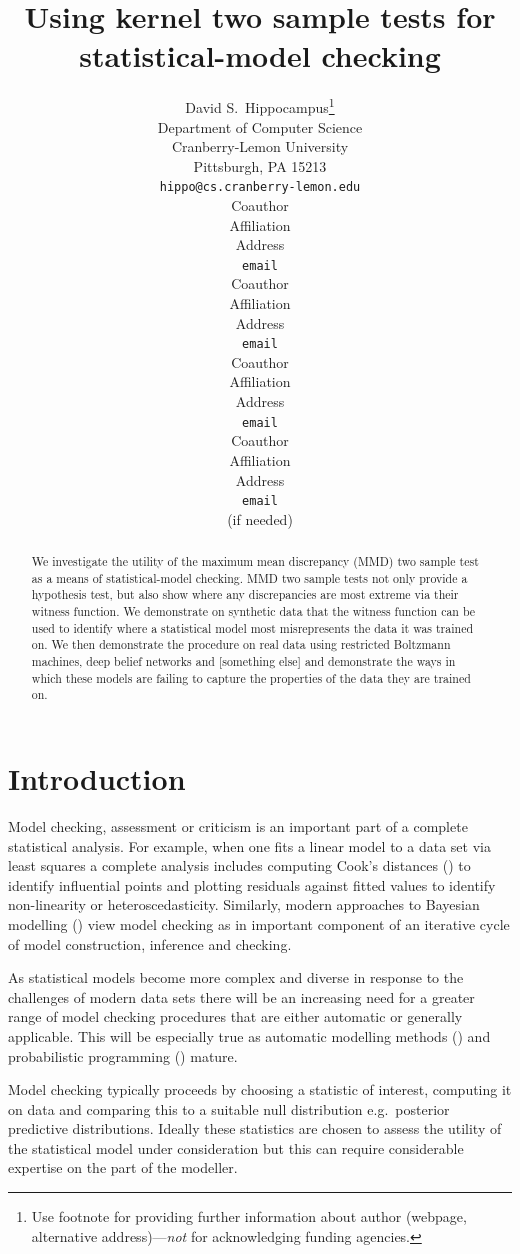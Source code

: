 \documentclass{article} %
\title{Using kernel two sample tests for\\statistical-model checking}
\author{
David S.~Hippocampus\thanks{ Use footnote for providing further information
about author (webpage, alternative address)---\emph{not} for acknowledging
funding agencies.} \\
Department of Computer Science\\
Cranberry-Lemon University\\
Pittsburgh, PA 15213 \\
\texttt{hippo@cs.cranberry-lemon.edu} \\
\And
Coauthor \\
Affiliation \\
Address \\
\texttt{email} \\
\AND
Coauthor \\
Affiliation \\
Address \\
\texttt{email} \\
\And
Coauthor \\
Affiliation \\
Address \\
\texttt{email} \\
\And
Coauthor \\
Affiliation \\
Address \\
\texttt{email} \\
(if needed)\\
}
\def\eg{e.g.\ }
\begin{document}
 

\maketitle

\begin{abstract} 
We investigate the utility of the maximum mean discrepancy (MMD) two sample test as a means of statistical-model checking.
MMD two sample tests not only provide a hypothesis test, but also show where any discrepancies are most extreme via their witness function.
We demonstrate on synthetic data that the witness function can be used to identify where a statistical model most misrepresents the data it was trained on.
We then demonstrate the procedure on real data using restricted Boltzmann machines, deep belief networks and [something else] and demonstrate the ways in which these models are failing to capture the properties of the data they are trained on.
\end{abstract} 

\allowdisplaybreaks

\section{Introduction}

Model checking, assessment or criticism is an important part of a complete statistical analysis.
For example, when one fits a linear model to a data set via least squares a complete analysis includes computing Cook's distances () to identify influential points and plotting residuals against fitted values to identify non-linearity or heteroscedasticity.
Similarly, modern approaches to Bayesian modelling () view model checking as in important component of an iterative cycle of model construction, inference and checking.

As statistical models become more complex and diverse in response to the challenges of modern data sets there will be an increasing need for a greater range of model checking procedures that are either automatic or generally applicable.
This will be especially true as automatic modelling methods () and probabilistic programming () mature.

Model checking typically proceeds by choosing a statistic of interest, computing it on data and comparing this to a suitable null distribution \eg posterior predictive distributions.
Ideally these statistics are chosen to assess the utility of the statistical model under consideration but this can require considerable expertise on the part of the modeller.
\end{document}
